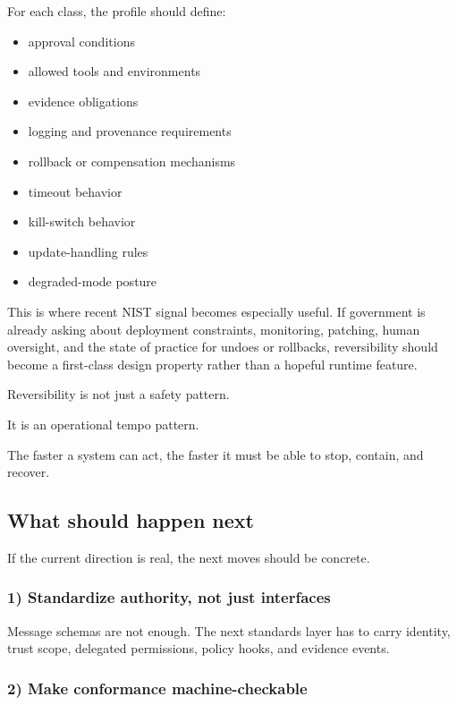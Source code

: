 \documentclass[11pt]{article}
\begin{document}
For each class, the profile should define:

\begin{itemize}
\tightlist
\item
  approval conditions
\item
  allowed tools and environments
\item
  evidence obligations
\item
  logging and provenance requirements
\item
  rollback or compensation mechanisms
\item
  timeout behavior
\item
  kill-switch behavior
\item
  update-handling rules
\item
  degraded-mode posture
\end{itemize}

This is where recent NIST signal becomes especially useful. If
government is already asking about deployment constraints, monitoring,
patching, human oversight, and the state of practice for undoes or
rollbacks, reversibility should become a first-class design property
rather than a hopeful runtime feature.

Reversibility is not just a safety pattern.

It is an operational tempo pattern.

The faster a system can act, the faster it must be able to stop,
contain, and recover.

\hypertarget{what-should-happen-next}{%
\subsection{What should happen next}\label{what-should-happen-next}}

If the current direction is real, the next moves should be concrete.

\hypertarget{standardize-authority-not-just-interfaces}{%
\subsubsection{1) Standardize authority, not just
interfaces}\label{standardize-authority-not-just-interfaces}}

Message schemas are not enough. The next standards layer has to carry
identity, trust scope, delegated permissions, policy hooks, and evidence
events.

\hypertarget{make-conformance-machine-checkable}{%
\subsubsection{2) Make conformance
machine-checkable}\label{make-conformance-machine-checkable}}
\end{document}
